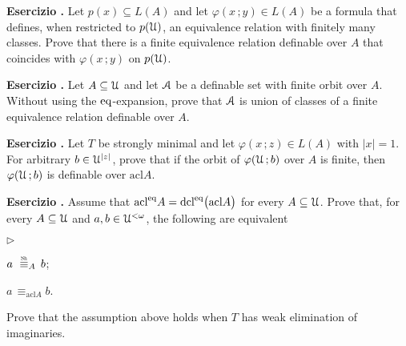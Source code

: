\documentclass[10pt]{article}
\def\phi{\varphi}
\def\Aa{\EuScript A}
\def\U{\EuScript U}
\def\acl{\textrm{acl}}
\def\dcl{\textrm{dcl}}
\def\eq{{\rm eq}}
\def\equivSh{\stackrel{\smash{\scalebox{.5}{\rm Sh}}}{\equiv}}
\newcommand{\labella}[1]{{\sf\footnotesize #1}\hfill}
\renewenvironment{itemize}
  {\begin{list}{$\triangleright$}{%
   \setlength{\parskip}{0mm}
   \setlength{\topsep}{0mm}
   \setlength{\rightmargin}{0mm}
   \setlength{\listparindent}{0mm}
   \setlength{\itemindent}{0mm}
   \setlength{\labelwidth}{3ex}
   \setlength{\itemsep}{0mm}
   \setlength{\parsep}{0mm}
   \setlength{\partopsep}{0mm}
   \setlength{\labelsep}{1ex}
   \setlength{\leftmargin}{\labelwidth+\labelsep}
   \let\makelabel\labella}}{%
   \end{list}}
\newcounter{ex}
\newenvironment{exercise}{\clearpage\addtocounter{ex}{1}\textbf{Esercizio \theex.\quad}}{}
\begin{document}
\clearpage%
\rhead{}


\begin{exercise}
Let $p( x)\subseteq L(A)$ and let $\phi( x\,; y)\in L(A)$ be a formula that defines, when restricted to $p(\U)$, an equivalence relation with finitely many classes.
Prove that there is a finite equivalence relation definable over $A$ that coincides with $\phi( x\,; y)$ on $p(\U)$.
\end{exercise}

\begin{exercise}\label{ex_feqthm_senza_eq}
Let $A\subseteq\U$ and let $\Aa$ be a definable set with finite orbit over $A$.
Without using the $\eq$-expansion, prove that $\Aa$ is union of classes of a finite equivalence relation definable over $A$.
\end{exercise}

\begin{exercise}
Let $T$ be strongly minimal and let $\phi( x\,; z)\in L(A)$ with $| x|=1$.
For arbitrary $ b\in\U^{| z|}$, prove that if the orbit of $\phi(\U\,;  b)$ over $A$ is finite, then $\phi(\U\,;  b)$ is definable over $\acl A$.
\end{exercise}

\begin{exercise}
  Assume that $\acl^\eq A=\dcl^\eq\big(\acl A\big)$ for every $A\subseteq\U$.
  Prove that, for every $A\subseteq\U$ and $a,b\in\U^{<\omega}$, the following are equivalent\smallskip
  \begin{itemize}
  \item[1.]  $a\ \equivSh_A\, b$;
  \item[2.]  $a\,\equiv_{\acl A}b$.
  \end{itemize} 
  Prove that the assumption above holds when $T$ has weak elimination of imaginaries.
\end{exercise}
\end{document}
